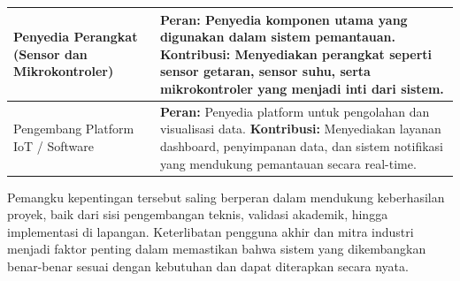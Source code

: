 \documentclass{elsinta}
\begin{document}
\begin{longtable}{|p{5cm}|p{9cm}|}
Penyedia Perangkat (Sensor dan Mikrokontroler) &
\textbf{Peran:} Penyedia komponen utama yang digunakan dalam sistem pemantauan. \newline
\textbf{Kontribusi:} Menyediakan perangkat seperti sensor getaran, sensor suhu, serta mikrokontroler yang menjadi inti dari sistem. \\
\hline

Pengembang Platform IoT / Software &
\textbf{Peran:} Penyedia platform untuk pengolahan dan visualisasi data. \newline
\textbf{Kontribusi:} Menyediakan layanan dashboard, penyimpanan data, dan sistem notifikasi yang mendukung pemantauan secara real-time. \\
\hline
\end{longtable}

Pemangku kepentingan tersebut saling berperan dalam mendukung keberhasilan proyek, baik dari sisi pengembangan teknis, validasi akademik, hingga implementasi di lapangan. Keterlibatan pengguna akhir dan mitra industri menjadi faktor penting dalam memastikan bahwa sistem yang dikembangkan benar-benar sesuai dengan kebutuhan dan dapat diterapkan secara nyata.

\section{\ReferencesTitle}
\renewcommand{\refname}{}      %

\section{\AbbrevTitle}
\end{document}
